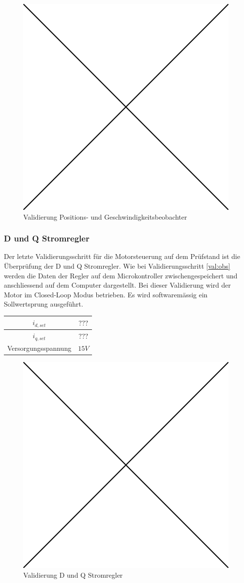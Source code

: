 \begin{figure} [H]
	\centering
	\includegraphics[width=0.5\linewidth]{images/placeholder.png}
	\caption{Validierung Positions- und Geschwindigkeitsbeobachter}
	\label{fig:observer}
\end{figure}

\subsubsection*{D und Q Stromregler}
Der letzte Validierungsschritt für die Motorsteuerung auf dem Prüfstand ist die Überprüfung der D und Q Stromregler. Wie bei Validierungsschritt \ref{val:obs} werden die Daten der Regler auf dem Microkontroller zwischengespeichert und anschliessend auf dem Computer dargestellt. Bei dieser Validierung wird der Motor im Closed-Loop Modus betrieben. Es wird softwaremässig ein Sollwertsprung ausgeführt.

\begin{center}
	\begin{tabular}{|c|c|}
		\hline 
		$i_{d,set}$ & $???$ \\ \hline
		$i_{q,set}$ & $???$ \\ \hline
		Versorgungsspannung & $15V$ \\ \hline
	\end{tabular} 
	\label{tab:regmessbed}
\end{center}

\begin{figure} [H]
	\centering
	\includegraphics[width=0.5\linewidth]{images/placeholder.png}
	\caption{Validierung D und Q Stromregler}
	\label{fig:reg}
\end{figure}

